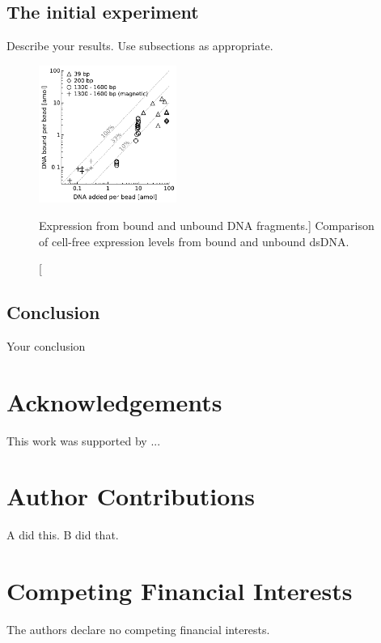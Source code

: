 \documentclass[10pt]{article}
\begin{document}
\subsection*{The initial experiment}

Describe your results. Use subsections as appropriate.

\begin{figure}[ht] %
\begin{center}
  \includegraphics[width=0.4\textwidth]{figures/fig_dna.pdf}
\end{center}
\vspace*{-7mm} %
\caption %
    [\label{sfig:bulkconcat} Expression from bound and unbound DNA fragments.]
    { %
      Comparison of cell-free expression levels from bound and unbound dsDNA.
    } 
\end{figure}

\subsection*{Conclusion}

Your conclusion

\section*{Acknowledgements}

This work was supported by ...


\section*{Author Contributions}

A did this. B did that.


\section*{Competing Financial Interests}

The authors declare no competing financial interests.

\printbibliography
\end{document}
